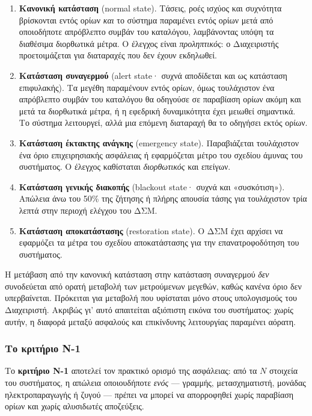\begin{enumerate}
\item \textbf{Κανονική κατάσταση} (normal state). Τάσεις, ροές ισχύος και συχνότητα
      βρίσκονται εντός ορίων \emph{και} το σύστημα παραμένει εντός ορίων μετά από
      οποιοδήποτε απρόβλεπτο συμβάν του καταλόγου, λαμβάνοντας υπόψη τα διαθέσιμα
      διορθωτικά μέτρα. Ο έλεγχος είναι \emph{προληπτικός}: ο Διαχειριστής
      προετοιμάζεται για διαταραχές που δεν έχουν εκδηλωθεί.
\item \textbf{Κατάσταση συναγερμού} (alert state· συχνά αποδίδεται και ως κατάσταση
      επιφυλακής). Τα μεγέθη παραμένουν εντός ορίων, όμως τουλάχιστον ένα απρόβλεπτο
      συμβάν του καταλόγου θα οδηγούσε σε παραβίαση ορίων ακόμη και μετά τα διορθωτικά
      μέτρα, ή η εφεδρική δυναμικότητα έχει μειωθεί σημαντικά. Το σύστημα λειτουργεί, αλλά
      μια επόμενη διαταραχή θα το οδηγήσει εκτός ορίων.
\item \textbf{Κατάσταση έκτακτης ανάγκης} (emergency state). Παραβιάζεται τουλάχιστον
      ένα όριο επιχειρησιακής ασφάλειας ή εφαρμόζεται μέτρο του σχεδίου άμυνας του
      συστήματος. Ο έλεγχος καθίσταται \emph{διορθωτικός} και επείγων.
\item \textbf{Κατάσταση γενικής διακοπής} (blackout state· συχνά και «συσκότιση»).
      Απώλεια άνω του 50\% της ζήτησης ή πλήρης απουσία τάσης για τουλάχιστον τρία λεπτά
      στην περιοχή ελέγχου του ΔΣΜ.
\item \textbf{Κατάσταση αποκατάστασης} (restoration state). Ο ΔΣΜ έχει αρχίσει να
      εφαρμόζει τα μέτρα του σχεδίου αποκατάστασης για την επανατροφοδότηση του συστήματος.
\end{enumerate}

Η μετάβαση από την κανονική κατάσταση στην κατάσταση συναγερμού \emph{δεν} συνοδεύεται από ορατή
μεταβολή των μετρούμενων μεγεθών, καθώς κανένα όριο δεν υπερβαίνεται. Πρόκειται για
μεταβολή που υφίσταται μόνο στους υπολογισμούς του Διαχειριστή. Ακριβώς γι' αυτό απαιτείται
αξιόπιστη εικόνα του συστήματος: χωρίς αυτήν, η διαφορά μεταξύ ασφαλούς και επικίνδυνης
λειτουργίας παραμένει αόρατη.

\subsubsection*{Το κριτήριο N-1}

Το \textbf{κριτήριο N-1} αποτελεί τον πρακτικό ορισμό της ασφάλειας: από τα $N$ στοιχεία
του συστήματος, η απώλεια οποιουδήποτε \emph{ενός} — γραμμής, μετασχηματιστή, μονάδας
ηλεκτροπαραγωγής ή ζυγού — πρέπει να μπορεί να απορροφηθεί χωρίς παραβίαση ορίων και χωρίς
αλυσιδωτές αποζεύξεις.

